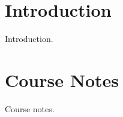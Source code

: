 \mainmatter
\setcounter{page}{1}

\lectureseries[\course]{\course}

\date{Lecture Date}

\setaddress

\setcounter{lecture}{0}
\setcounter{chapter}{0}


\section{Introduction}
Introduction.

\section{Course Notes}
Course notes.
